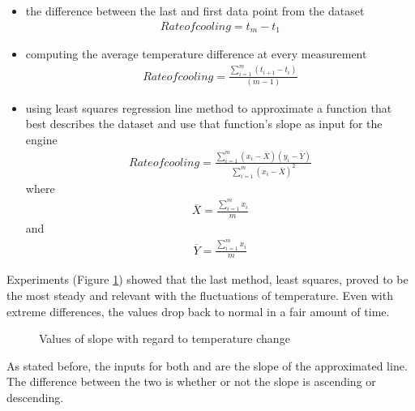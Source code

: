 \begin{itemize}
\item the difference between the last and first data point from the dataset
    \begin{align}
    Rate of cooling = t_{m} - t_{1}
    \end{align}

\item computing the average temperature difference at every measurement
    \begin{align}
    Rate of cooling = \frac{\sum_{i=1}^{m}(t_{i + 1} - t_{i})}{(m - 1)}
    \end{align}

\item using least squares regression line method to approximate a function that best describes the dataset
and use that function's slope as input for the engine
    \begin{align}
    Rate of cooling = \frac{\sum_{i=1}^{m}(x_{i} - \overline{X})(y_{i} - \overline{Y})}{\sum_{i=1}^{m}(x_{i} - \overline{X})^2}
    \end{align}
    where
    \begin{align}
    \overline{X} = \frac{\sum_{i=1}^{m} x_{i}}{m}
    \end{align}
    and
    \begin{align}
    \overline{Y} = \frac{\sum_{i=1}^{m} x_{i}}{m}
    \end{align}

\end{itemize}

\qquad Experiments (Figure \ref{fig:experiments}) showed that the last method, least squares, proved to be the most
steady and relevant with the fluctuations of temperature.
Even with extreme differences, the values drop back to normal in a fair amount of time.

\begin{figure}[h!]
    \label{fig:nn}
    \centerline{}
          \caption[Values of slope with regard to temperature change]{Values of slope with regard to temperature
                                                                      change}
    \label{fig:experiments}
\end{figure}


\qquad As stated before, the inputs for both  and  are the slope
of the approximated line. The difference between the two is whether or not the slope is ascending or
descending.

